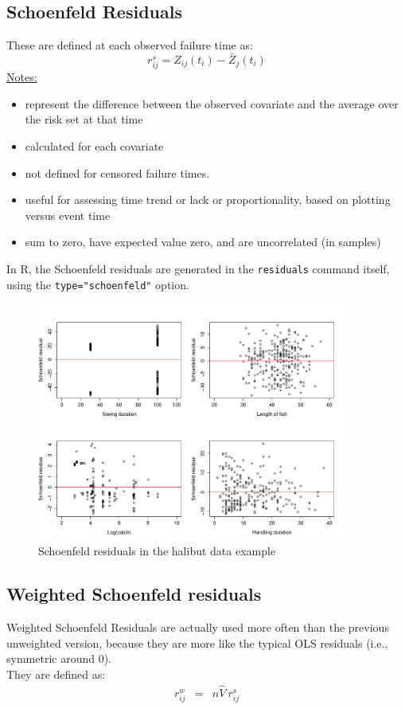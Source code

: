 \documentclass[11pt]{book}
\begin{document}
\subsection{Schoenfeld Residuals}
These are defined at each observed failure time as:
\[r_{ij}^s=Z_{ij}(t_i)-\bar{Z}_j(t_i)\]
\underline{Notes:}
\begin{itemize}
\item represent the difference between the observed covariate
and the average over the risk set at that time
\item calculated for each covariate
\item not defined for censored
failure times.
\item useful for assessing time trend or lack or proportionality,
based on plotting versus event time
\item sum to zero, have expected value zero, and
are uncorrelated (in  samples)
\end{itemize}
In R, the Schoenfeld residuals are generated in the {\tt residuals}
command itself, using the {\tt type="schoenfeld"} option.

\begin{figure}[h!]
\caption{Schoenfeld residuals in the halibut data example}
\centerline{\includegraphics[width=4in]{sch_res.pdf}}
\end{figure}
\subsection{Weighted Schoenfeld residuals}
Weighted Schoenfeld Residuals are actually used more often than the previous unweighted
version, because they are more like the typical OLS residuals (i.e.,
symmetric around 0).
\\[2ex]
They are defined as:
\begin{eqnarray*}
r_{ij}^w & = & n \widehat{V}~ r_{ij}^s
\end{eqnarray*}
\end{document}
